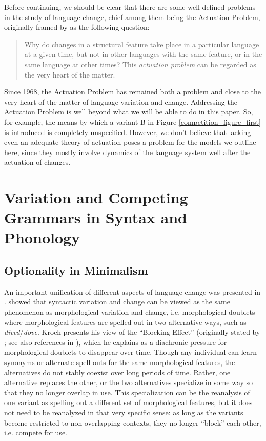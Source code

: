 Before continuing, we should be clear that there are some well defined problems in the study of language change, chief among them being the Actuation Problem, originally framed by \citet{wlh1968} as the following question:
	\begin{quote}
		Why do changes in a structural feature take place in a particular language at a given time, but not in other languages with the same feature, or in the same language at other times? This \textsl{actuation problem} can be regarded as the very heart of the matter.
	\end{quote}
Since 1968, the Actuation Problem has remained both a problem and close to the very heart of the matter of language variation and change.
Addressing the Actuation Problem is well beyond what we will be able to do in this paper.
So, for example, the means by which a variant B in Figure \ref{competition_figure_first} is introduced is completely unspecified.
However, we don't believe that lacking even an adequate theory of actuation poses a problem for the models we outline here, since they mostly involve dynamics of the language system well after the actuation of changes.

\section{Variation and Competing Grammars in Syntax and Phonology}
\subsection{Optionality in Minimalism}

An important unification of different aspects of language change was presented in \citet{kroch1994}.
\citet{kroch1994} showed that syntactic variation and change can be viewed as the same phenomenon as morphological variation and change, i.e. morphological doublets where morphological features are spelled out in two alternative ways, such as \textsl{dived}/\textsl{dove}.
Kroch presents his view of the ``Blocking Effect'' (originally stated by \citealt{aronoff1976}; see also references in \citealt{kroch1994}), which he explains as a diachronic pressure for morphological doublets to disappear over time.
Though any individual can learn synonyms or alternate spell-outs for the same morphological features, the alternatives do not stably coexist over long periods of time.
Rather, one alternative replaces the other, or the two alternatives specialize in some way so that they no longer overlap in use.
This specialization can be the reanalysis of one variant as spelling out a different set of morphological features, but it does not need to be reanalyzed in that very specific sense: as long as the variants become restricted to non-overlapping contexts, they no longer ``block'' each other, i.e. compete for use.

